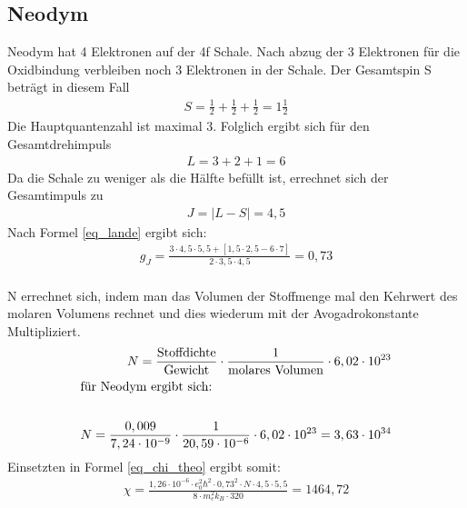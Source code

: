 \subsection{Neodym }
Neodym hat 4 Elektronen auf der 4f Schale. Nach abzug der 3 Elektronen für die Oxidbindung verbleiben noch 3 Elektronen in der Schale. Der Gesamtspin S beträgt in diesem Fall 
\begin{align*}
S=\frac{1}{2}+ \frac{1}{2}+ \frac{1}{2} = 1 \frac{1}{2}
\end{align*}
Die Hauptquantenzahl ist maximal 3. Folglich ergibt sich für den Gesamtdrehimpuls \begin{align*}
L=3+2+1=6
\end{align*}
Da die Schale zu weniger als die Hälfte befüllt ist, errechnet sich der Gesamtimpuls zu 
\begin{align*}
J=|L-S|=4,5
\end{align*}
Nach Formel \eqref{eq_lande} ergibt sich:
\begin{align}
g_J=\frac{3\cdot4,5\cdot5,5+[1,5\cdot2,5-6\cdot7]}{2\cdot 3,5\cdot4,5}=0,73
\end{align}\\
N errechnet sich, indem man das Volumen der Stoffmenge mal den Kehrwert des molaren Volumens rechnet und dies wiederum mit der Avogadrokonstante Multipliziert.
\begin{align}
N=\frac{\text{Stoffdichte}}{\text{Gewicht}}\cdot\frac{1}{\text{molares Volumen}}\cdot6,02\cdot10^{23}
\label{eq_N}\\
\intertext{für Neodym ergibt sich:}\\
N=\frac{0,009}{7,24\cdot10^{-9}}\cdot\frac{1}{20,59\cdot10^{-6}}\cdot6,02\cdot10^{23}= 3,63\cdot10^{34}
\end{align}
Einsetzten in Formel \eqref{eq_chi_theo} ergibt somit:
\begin{align}
\chi= \frac{1,26\cdot 10^{-6}\cdot e_0^2\hbar^2 \cdot 0,73^2 \cdot N\cdot 4,5\cdot 5,5}{8\cdot m_e^2 k_B \cdot320}=1464,72
\end{align}

